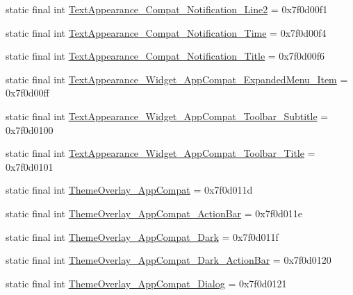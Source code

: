 \begin{DoxyCompactItemize}
static final int \mbox{\hyperlink{classcom_1_1synnapps_1_1carouselview_1_1_r_1_1style_ad29e0f4bcea593ab3f54856c3e79a3af}{Text\+Appearance\+\_\+\+Compat\+\_\+\+Notification\+\_\+\+Line2}} = 0x7f0d00f1
\item 
static final int \mbox{\hyperlink{classcom_1_1synnapps_1_1carouselview_1_1_r_1_1style_ae7da3d4f48446c3cd12cafa4596682c1}{Text\+Appearance\+\_\+\+Compat\+\_\+\+Notification\+\_\+\+Time}} = 0x7f0d00f4
\item 
static final int \mbox{\hyperlink{classcom_1_1synnapps_1_1carouselview_1_1_r_1_1style_a635deb5fea664b30dc2424671ce487ba}{Text\+Appearance\+\_\+\+Compat\+\_\+\+Notification\+\_\+\+Title}} = 0x7f0d00f6
\item 
static final int \mbox{\hyperlink{classcom_1_1synnapps_1_1carouselview_1_1_r_1_1style_a7cf038be1ea225953ec22629277c4da5}{Text\+Appearance\+\_\+\+Widget\+\_\+\+App\+Compat\+\_\+\+Expanded\+Menu\+\_\+\+Item}} = 0x7f0d00ff
\item 
static final int \mbox{\hyperlink{classcom_1_1synnapps_1_1carouselview_1_1_r_1_1style_a8f35ef7873e36e022a70946b23053186}{Text\+Appearance\+\_\+\+Widget\+\_\+\+App\+Compat\+\_\+\+Toolbar\+\_\+\+Subtitle}} = 0x7f0d0100
\item 
static final int \mbox{\hyperlink{classcom_1_1synnapps_1_1carouselview_1_1_r_1_1style_ac7759c03009993c6dd4d8f9ec50e86f4}{Text\+Appearance\+\_\+\+Widget\+\_\+\+App\+Compat\+\_\+\+Toolbar\+\_\+\+Title}} = 0x7f0d0101
\item 
static final int \mbox{\hyperlink{classcom_1_1synnapps_1_1carouselview_1_1_r_1_1style_ae3270eeff0640d933d34cf9699f45d42}{Theme\+Overlay\+\_\+\+App\+Compat}} = 0x7f0d011d
\item 
static final int \mbox{\hyperlink{classcom_1_1synnapps_1_1carouselview_1_1_r_1_1style_a0fa9cb85379114b4bf9770ee892dd3da}{Theme\+Overlay\+\_\+\+App\+Compat\+\_\+\+Action\+Bar}} = 0x7f0d011e
\item 
static final int \mbox{\hyperlink{classcom_1_1synnapps_1_1carouselview_1_1_r_1_1style_a5a6950cf27e4e2ed7ddea48cd3dee2e3}{Theme\+Overlay\+\_\+\+App\+Compat\+\_\+\+Dark}} = 0x7f0d011f
\item 
static final int \mbox{\hyperlink{classcom_1_1synnapps_1_1carouselview_1_1_r_1_1style_afba4e7be730f81c247411f940cbc4bff}{Theme\+Overlay\+\_\+\+App\+Compat\+\_\+\+Dark\+\_\+\+Action\+Bar}} = 0x7f0d0120
\item 
static final int \mbox{\hyperlink{classcom_1_1synnapps_1_1carouselview_1_1_r_1_1style_aec2e7b6de9e6cbd5d421dfd76b8086dd}{Theme\+Overlay\+\_\+\+App\+Compat\+\_\+\+Dialog}} = 0x7f0d0121

\end{DoxyCompactItemize}
